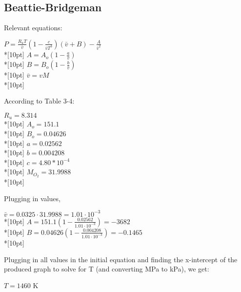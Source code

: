 \documentclass{article}
\begin{document}
\subsection{Beattie-Bridgeman}
Relevant equations:
\begin{center}
\(\displaystyle P=\frac{R_uT}{\bar{v}}(1-\frac{c}{\bar{v}T^3})(\bar{v}+B)-\frac{A}{\bar{v}^2}\)\\*[10pt]
\(\displaystyle A=A_o(1-\frac{a}{\bar{v}})\)\\*[10pt]
\(\displaystyle B=B_o(1-\frac{b}{\bar{v}})\)\\*[10pt]
\(\displaystyle \bar{v}=vM\)\\*[10pt]
\end{center}
According to Table 3-4:
\begin{center}
\(\displaystyle R_u=8.314\)\\*[10pt]
\(\displaystyle A_o=151.1\)\\*[10pt]
\(\displaystyle B_o=0.04626\)\\*[10pt]
\(\displaystyle a=0.02562\)\\*[10pt]
\(\displaystyle b=0.004208\)\\*[10pt]
\(\displaystyle c=4.80*10^{-4}\)\\*[10pt]
\(\displaystyle M_{O_2}=31.9988\)\\*[10pt]
\end{center}
Plugging in values,
\begin{center}
\(\displaystyle \bar{v}=0.0325\cdot 31.9988 =1.01\cdot10^{-3}\)\\*[10pt]
\(\displaystyle A=151.1(1-\frac{0.02562}{{1.01\cdot10^{-3}}})=-3682\)\\*[10pt]
\(\displaystyle B=0.04626(1-\frac{0.004208}{1.01\cdot10^{-3}})=-0.1465\)\\*[10pt]
\end{center}
Plugging in all values in the initial equation and finding the x-intercept of the produced graph to solve for T (and converting MPa to kPa), we get:
\begin{center}
\(T=1460\) K
\end{center}

\clearpage \noindent
\end{document}
